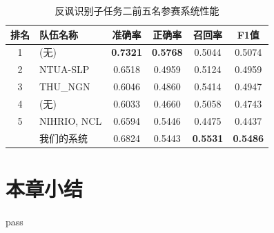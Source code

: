 \begin{table}[htb]
  \centering
  \begin{minipage}[t]{0.8\linewidth}
  \caption{反讽识别子任务二前五名参赛系统性能}
  \label{tab:exp_irony_det_B_other_comp}
    \begin{tabularx}{\linewidth}{c|X|cccc}
    \toprule[1.5pt]
    排名 & 队伍名称 & 准确率 & 正确率 & 召回率 & F1值 \\
    \hline 
    1 & (无) & \bf 0.7321 & \bf 0.5768 & 0.5044 & 0.5074 \\
    2 & NTUA-SLP & 0.6518 & 0.4959 & 0.5124 & 0.4959 \\
    3 & THU\_NGN & 0.6046 & 0.4860 & 0.5414 & 0.4947 \\
    4 & (无) & 0.6033 & 0.4660 & 0.5058 & 0.4743 \\
    5 & NIHRIO, NCL & 0.6594 & 0.5446 & 0.4475 & 0.4437 \\
    \hline
    & 我们的系统 & 0.6824 & 0.5443 & \bf 0.5531 & \bf 0.5486 \\
    \bottomrule[1.5pt]
    \end{tabularx}
  \end{minipage}
\end{table}


\section{本章小结}

pass


